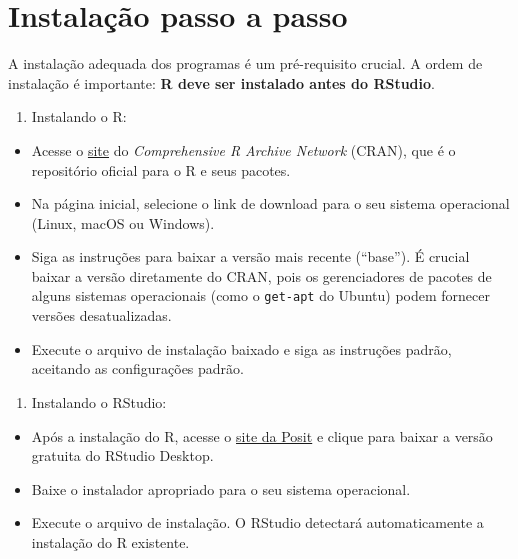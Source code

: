\documentclass[
  12pt,
  letterpaper,
  DIV=11,
  numbers=noendperiod]{scrreprt}
\providecommand{\tightlist}{%
  \setlength{\itemsep}{0pt}\setlength{\parskip}{0pt}}\usepackage{longtable,booktabs,array}
\begin{document}
\section{Instalação passo a passo}\label{instalauxe7uxe3o-passo-a-passo}

A instalação adequada dos programas é um pré-requisito crucial. A ordem
de instalação é importante: \textbf{R deve ser instalado antes do
RStudio}.

\begin{enumerate}
\def\labelenumi{\arabic{enumi}.}
\tightlist
\item
  Instalando o R:
\end{enumerate}

\begin{itemize}
\tightlist
\item
  Acesse o \href{https://cran.r-project.org/}{site} do
  \emph{Comprehensive R Archive Network} (CRAN), que é o repositório
  oficial para o R e seus pacotes.
\item
  Na página inicial, selecione o link de download para o seu sistema
  operacional (Linux, macOS ou Windows).
\item
  Siga as instruções para baixar a versão mais recente (``base''). É
  crucial baixar a versão diretamente do CRAN, pois os gerenciadores de
  pacotes de alguns sistemas operacionais (como o \texttt{get-apt} do
  Ubuntu) podem fornecer versões desatualizadas.
\item
  Execute o arquivo de instalação baixado e siga as instruções padrão,
  aceitando as configurações padrão.
\end{itemize}

\begin{enumerate}
\def\labelenumi{\arabic{enumi}.}
\setcounter{enumi}{1}
\tightlist
\item
  Instalando o RStudio:
\end{enumerate}

\begin{itemize}
\tightlist
\item
  Após a instalação do R, acesse o
  \href{https://posit.co/download/rstudio-desktop/}{site da Posit} e
  clique para baixar a versão gratuita do RStudio Desktop.
\item
  Baixe o instalador apropriado para o seu sistema operacional.
\item
  Execute o arquivo de instalação. O RStudio detectará automaticamente a
  instalação do R existente.
\end{itemize}
\end{document}
